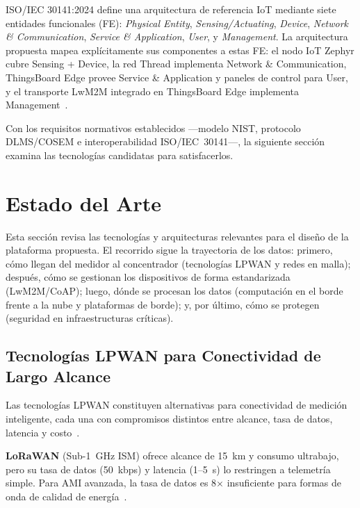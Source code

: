 ISO/IEC 30141:2024 define una arquitectura de referencia IoT mediante siete entidades funcionales (FE): \textit{Physical Entity}, \textit{Sensing/Actuating}, \textit{Device}, \textit{Network \& Communication}, \textit{Service \& Application}, \textit{User}, y \textit{Management}. La arquitectura propuesta mapea explícitamente sus componentes a estas FE: el nodo IoT Zephyr cubre Sensing + Device, la red Thread implementa Network \& Communication, ThingsBoard Edge provee Service \& Application y paneles de control para User, y el transporte LwM2M integrado en ThingsBoard Edge implementa Management~\cite{ISOIEC30141v2024}.

Con los requisitos normativos establecidos ---modelo NIST, protocolo DLMS/COSEM e interoperabilidad ISO/IEC~30141---, la siguiente sección examina las tecnologías candidatas para satisfacerlos.


\section{Estado del Arte}
\label{sec:marco-estado-arte}

Esta sección revisa las tecnologías y arquitecturas relevantes para el diseño de la plataforma propuesta. El recorrido sigue la trayectoria de los datos: primero, cómo llegan del medidor al concentrador (tecnologías LPWAN y redes en malla); después, cómo se gestionan los dispositivos de forma estandarizada (LwM2M/CoAP); luego, dónde se procesan los datos (computación en el borde frente a la nube y plataformas de borde); y, por último, cómo se protegen (seguridad en infraestructuras críticas).

\subsection{Tecnologías LPWAN para Conectividad de Largo Alcance}
\label{sec:lpwan-technologies}

Las tecnologías LPWAN constituyen alternativas para conectividad de medición inteligente, cada una con compromisos distintos entre alcance, tasa de datos, latencia y costo~\cite{chaudhariLPWANTechnologiesEmerging2020,ugwuanyiSurveyIoTDeveloping2021}.

\textbf{LoRaWAN} (Sub-1~GHz ISM) ofrece alcance de 15~km y consumo ultrabajo, pero su tasa de datos (50~kbps) y latencia (1--5~s) lo restringen a telemetría simple. Para AMI avanzada, la tasa de datos es 8$\times$ insuficiente para formas de onda de calidad de energía~\cite{chaudhariLPWANTechnologiesEmerging2020}.

